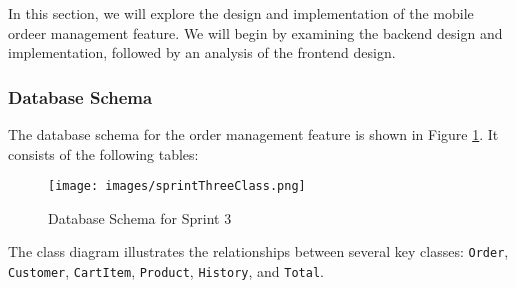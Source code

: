 In this section, we will explore the design and implementation of the mobile ordeer management feature. We will begin by examining the backend design and implementation, followed by an analysis of the frontend design.

\subsubsection{Database Schema}

The database schema for the order management feature is shown in Figure \ref{fig:db_schema_sprint3}. It consists of the following tables:

\begin{figure}[H]
    \centering
    \texttt{[image: images/sprintThreeClass.png]}
    \caption{Database Schema for Sprint 3}
    \label{fig:db_schema_sprint3}
\end{figure}

The class diagram illustrates the relationships between several key classes: \texttt{Order}, \texttt{Customer}, \texttt{CartItem}, \texttt{Product}, \texttt{History}, and \texttt{Total}.

